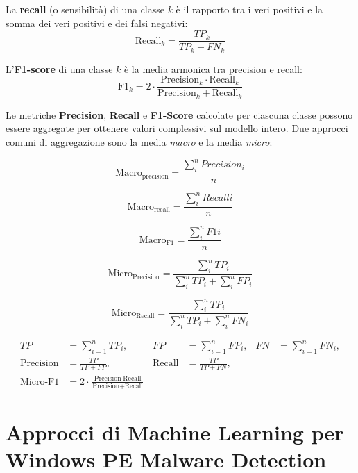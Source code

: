 La \textbf{recall} (o sensibilità) di una classe $k$ è il rapporto tra i veri
positivi e la somma dei veri positivi e dei falsi negativi:
\[
      \mathrm{Recall}_k = \frac{TP_k}{TP_k + FN_k}
\]

L'\textbf{F1-score} di una classe $k$ è la media armonica tra precision e recall:
\[
      \mathrm{F1}_k = 2 \cdot \frac{\mathrm{Precision}_k \cdot \mathrm{Recall}_k}
      {\mathrm{Precision}_k + \mathrm{Recall}_k}
\]

Le metriche \textbf{Precision}, \textbf{Recall} e \textbf{F1-Score} calcolate per ciascuna classe
possono essere aggregate per ottenere valori complessivi sul modello intero. Due approcci
comuni di aggregazione sono la media \textit{macro} e la media \textit{micro}:

\[
      \mathrm{Macro_{precision}} = \frac{\sum_{i}^{n} Precision_{i}}{n}
\]

\[
      \mathrm{Macro_{recall}} = \frac{\sum_{i}^{n} Recall{i}}{n}
\]

\[
      \mathrm{Macro_{F1}} = \frac{\sum_{i}^{n} F1{i}}{n}
\]

\[
      \mathrm{Micro_{Precision}} = \frac{\sum_{i}^{n} TP_{i}}{\sum_{i}^{n} TP_{i} + \sum_{i}^{n} FP_{i}}
\]

\[
      \mathrm{Micro_{Recall}} = \frac{\sum_{i}^{n} TP_{i}}{\sum_{i}^{n} TP_{i} + \sum_{i}^{n} FN_{i}}
\]

\[
      \begin{aligned}
            TP               & = \sum_{i=1}^{n} TP_i,                                                                  & FP            & = \sum_{i=1}^{n} FP_i, & FN & = \sum_{i=1}^{n} FN_i, \\[1mm]
            \text{Precision} & = \frac{TP}{TP + FP},                                                                   & \text{Recall} & = \frac{TP}{TP + FN},                                \\[1mm]
            \text{Micro-F1}  & = 2 \cdot \frac{\text{Precision} \cdot \text{Recall}}{\text{Precision} + \text{Recall}}
      \end{aligned}
\]

\section{Approcci di Machine Learning per Windows PE Malware Detection}


